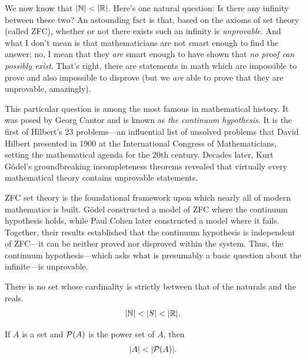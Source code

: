 \documentclass[11pt,twoside=off,numbers=noenddot]{scrbook}
\begin{document}
\begin{remark}
  We now know that $| \mathbb N | < | \mathbb R |$. Here's one natural
  question: Is there any infinity between these two? An astounding
  fact is that, based on the axioms of set theory (called ZFC),
  whether or not there exists such an infinity is
  \textit{unprovable}. And what I don't mean is that mathematicians
  are not smart enough to find the answer; no, I mean that they
  \textit{are} smart enough to have shown that \textit{no proof can
  possibly exist}. That's right, there are statements in math which
  are impossible to prove and also impossible to disprove (but we
  \textit{are} able to prove that they are unprovable, amazingly).

  This particular question is among the most famous in mathematical
  history. It was posed by Georg Cantor and is known as \textit{the
  continuum hypothesis}. It is the first of Hilbert's 23 problems—an
  influential list of unsolved problems that David Hilbert presented
  in 1900 at the International Congress of Mathematicians, setting
  the mathematical agenda for the 20th century. Decades later, Kurt
  Gödel's groundbreaking incompleteness theorems revealed that
  virtually every mathematical theory contains unprovable statements.

  ZFC set theory is the foundational framework upon which nearly all
  of modern mathematics is built. Gödel constructed a model of ZFC
  where the continuum hypothesis holds, while Paul Cohen later
  constructed a model where it fails. Together, their results
  established that the continuum hypothesis is independent of
  ZFC---it can be neither proved nor disproved within the system.
  Thus, the continuum hypothesis---which asks what is presumably a
  basic question about the infinite---is unprovable.
\end{remark}

\begin{hypothesis}
  There is no set whose cardinality is strictly between that of the
  naturals and the reals.
  \begin{align*}
    | \mathbb N | < | S | < | \mathbb R |.
  \end{align*}
\end{hypothesis}

\begin{theorem}
  If $A$ is a set and $\mathcal{P}(A)$ is the power set of $A$, then
  \begin{align*}
    | A | < | \mathcal{P}(A) |.
  \end{align*}
\end{theorem}
\end{document}
